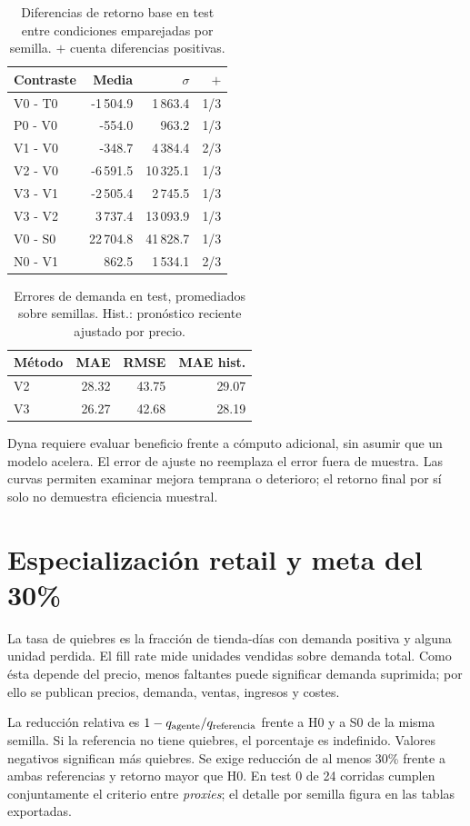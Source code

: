 \documentclass[conference]{IEEEtran}
\begin{document}
\begin{table}[t]
\caption{Diferencias de retorno base en test entre condiciones emparejadas por semilla. $+$ cuenta diferencias positivas.}
\centering\scriptsize
\begin{tabular}{lrrr}
\toprule Contraste & Media & $\sigma$ & $+$\\\midrule
V0 - T0 & -1\,504.9 & 1\,863.4 & 1/3 \\
P0 - V0 & -554.0 & 963.2 & 1/3 \\
V1 - V0 & -348.7 & 4\,384.4 & 2/3 \\
V2 - V0 & -6\,591.5 & 10\,325.1 & 1/3 \\
V3 - V1 & -2\,505.4 & 2\,745.5 & 1/3 \\
V3 - V2 & 3\,737.4 & 13\,093.9 & 1/3 \\
V0 - S0 & 22\,704.8 & 41\,828.7 & 1/3 \\
N0 - V1 & 862.5 & 1\,534.1 & 2/3 \\
\bottomrule
\end{tabular}
\end{table}
\begin{table}[t]
\caption{Errores de demanda en test, promediados sobre semillas. Hist.: pronóstico reciente ajustado por precio.}
\centering\small
\begin{tabular}{lrrr}
\toprule Método & MAE & RMSE & MAE hist.\\\midrule
V2 & 28.32 & 43.75 & 29.07 \\
V3 & 26.27 & 42.68 & 28.19 \\
\bottomrule
\end{tabular}
\end{table}
Dyna requiere evaluar beneficio frente a cómputo adicional, sin asumir que un modelo acelera. El error de ajuste no reemplaza el error fuera de muestra. Las curvas permiten examinar mejora temprana o deterioro; el retorno final por sí solo no demuestra eficiencia muestral.

\section{Especialización retail y meta del 30\%}
La tasa de quiebres es la fracción de tienda-días con demanda positiva y alguna unidad perdida. El fill rate mide unidades vendidas sobre demanda total. Como ésta depende del precio, menos faltantes puede significar demanda suprimida; por ello se publican precios, demanda, ventas, ingresos y costes.

La reducción relativa es $1-q_{\rm agente}/q_{\rm referencia}$ frente a H0 y a S0 de la misma semilla. Si la referencia no tiene quiebres, el porcentaje es indefinido. Valores negativos significan más quiebres. Se exige reducción de al menos 30\% frente a ambas referencias y retorno mayor que H0. En test 0 de 24 corridas cumplen conjuntamente el criterio entre \emph{proxies}; el detalle por semilla figura en las tablas exportadas.
\end{document}
